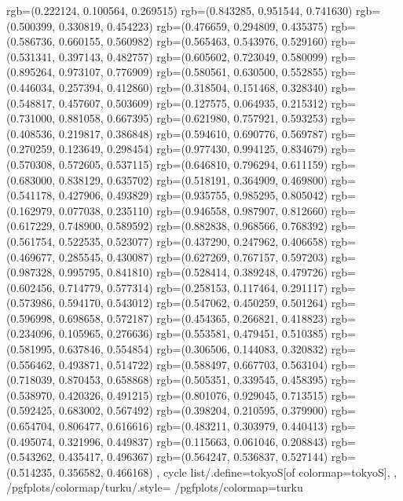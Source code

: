 {{{					rgb=(0.222124, 0.100564, 0.269515)
					rgb=(0.843285, 0.951544, 0.741630)
					rgb=(0.500399, 0.330819, 0.454223)
					rgb=(0.476659, 0.294809, 0.435375)
					rgb=(0.586736, 0.660155, 0.560982)
					rgb=(0.565463, 0.543976, 0.529160)
					rgb=(0.531341, 0.397143, 0.482757)
					rgb=(0.605602, 0.723049, 0.580099)
					rgb=(0.895264, 0.973107, 0.776909)
					rgb=(0.580561, 0.630500, 0.552855)
					rgb=(0.446034, 0.257394, 0.412860)
					rgb=(0.318504, 0.151468, 0.328340)
					rgb=(0.548817, 0.457607, 0.503609)
					rgb=(0.127575, 0.064935, 0.215312)
					rgb=(0.731000, 0.881058, 0.667395)
					rgb=(0.621980, 0.757921, 0.593253)
					rgb=(0.408536, 0.219817, 0.386848)
					rgb=(0.594610, 0.690776, 0.569787)
					rgb=(0.270259, 0.123649, 0.298454)
					rgb=(0.977430, 0.994125, 0.834679)
					rgb=(0.570308, 0.572605, 0.537115)
					rgb=(0.646810, 0.796294, 0.611159)
					rgb=(0.683000, 0.838129, 0.635702)
					rgb=(0.518191, 0.364909, 0.469800)
					rgb=(0.541178, 0.427906, 0.493829)
					rgb=(0.935755, 0.985295, 0.805042)
					rgb=(0.162979, 0.077038, 0.235110)
					rgb=(0.946558, 0.987907, 0.812660)
					rgb=(0.617229, 0.748900, 0.589592)
					rgb=(0.882838, 0.968566, 0.768392)
					rgb=(0.561754, 0.522535, 0.523077)
					rgb=(0.437290, 0.247962, 0.406658)
					rgb=(0.469677, 0.285545, 0.430087)
					rgb=(0.627269, 0.767157, 0.597203)
					rgb=(0.987328, 0.995795, 0.841810)
					rgb=(0.528414, 0.389248, 0.479726)
					rgb=(0.602456, 0.714779, 0.577314)
					rgb=(0.258153, 0.117464, 0.291117)
					rgb=(0.573986, 0.594170, 0.543012)
					rgb=(0.547062, 0.450259, 0.501264)
					rgb=(0.596998, 0.698658, 0.572187)
					rgb=(0.454365, 0.266821, 0.418823)
					rgb=(0.234096, 0.105965, 0.276636)
					rgb=(0.553581, 0.479451, 0.510385)
					rgb=(0.581995, 0.637846, 0.554854)
					rgb=(0.306506, 0.144083, 0.320832)
					rgb=(0.556462, 0.493871, 0.514722)
					rgb=(0.588497, 0.667703, 0.563104)
					rgb=(0.718039, 0.870453, 0.658868)
					rgb=(0.505351, 0.339545, 0.458395)
					rgb=(0.538970, 0.420326, 0.491215)
					rgb=(0.801076, 0.929045, 0.713515)
					rgb=(0.592425, 0.683002, 0.567492)
					rgb=(0.398204, 0.210595, 0.379900)
					rgb=(0.654704, 0.806477, 0.616616)
					rgb=(0.483211, 0.303979, 0.440413)
					rgb=(0.495074, 0.321996, 0.449837)
					rgb=(0.115663, 0.061046, 0.208843)
					rgb=(0.543262, 0.435417, 0.496367)
					rgb=(0.564247, 0.536837, 0.527144)
					rgb=(0.514235, 0.356582, 0.466168)
			},
		cycle list/.define={tokyoS}{[of colormap=tokyoS]},
		},
		/pgfplots/colormap/turku/.style={
			/pgfplots/colormap={turku}{%
}}}
